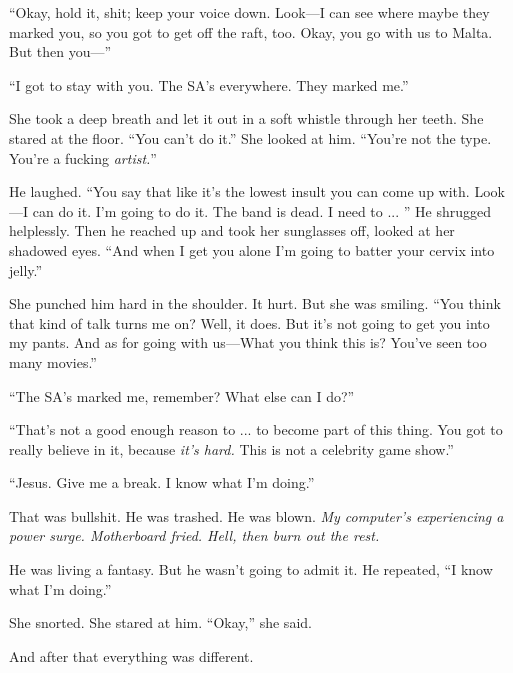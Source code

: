 ``Okay, hold it, shit; keep your voice down. Look---I can see where maybe they marked you, so you got to get off the raft, too. Okay, you go with us to Malta. But then you---''

``I got to stay with you. The SA's everywhere. They marked me.''

She took a deep breath and let it out in a soft whistle through her teeth. She stared at the floor. ``You can't do it.'' She looked at him. ``You're not the type. You're a fucking \textit{artist.}''

He laughed. ``You say that like it's the lowest insult you can come up with. Look---I can do it. I'm going to do it. The band is dead. I need to ... '' He shrugged helplessly. Then he reached up and took her sunglasses off, looked at her shadowed eyes. ``And when I get you alone I'm going to batter your cervix into jelly.''

She punched him hard in the shoulder. It hurt. But she was smiling. ``You think that kind of talk turns me on? Well, it does. But it's not going to get you into my pants. And as for going with us---What you think this is? You've seen too many movies.''

``The SA's marked me, remember? What else can I do?''

``That's not a good enough reason to ... to become part of this thing. You got to really believe in it, because \textit{it's hard.} This is not a celebrity game show.''

``Jesus. Give me a break. I know what I'm doing.''

That was bullshit. He was trashed. He was blown. \textit{My computer's experiencing a power surge. Motherboard fried. Hell, then burn out the rest.}

He was living a fantasy. But he wasn't going to admit it. He repeated, ``I know what I'm doing.''

She snorted. She stared at him. ``Okay,'' she said.

And after that everything was different.
